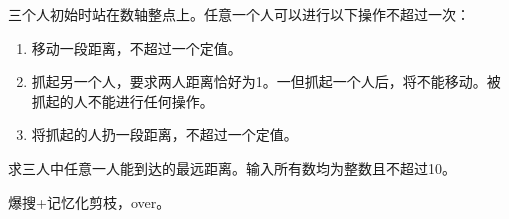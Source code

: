 \begin{prob}
	三个人初始时站在数轴整点上。任意一个人可以进行以下操作不超过一次：
	\begin{enumerate}
		\item 移动一段距离，不超过一个定值。
		\item 抓起另一个人，要求两人距离恰好为1。一但抓起一个人后，将不能移动。被抓起的人不能进行任何操作。
		\item 将抓起的人扔一段距离，不超过一个定值。
	\end{enumerate}
	求三人中任意一人能到达的最远距离。输入所有数均为整数且不超过10。
\end{prob}

\begin{sol}
	爆搜+记忆化剪枝，over。
\end{sol}

